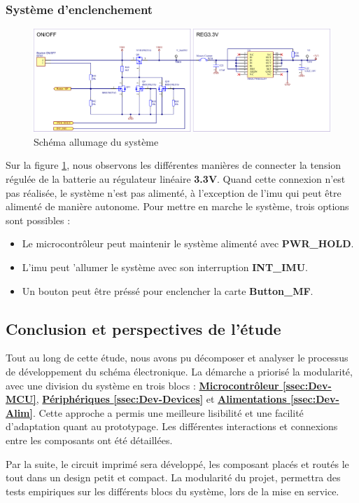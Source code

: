 \clearpage

\subsubsection{Système d'enclenchement} \label{sssec:On-OFF}


\begin{figure}[h]
	\centering
	\includegraphics[width=1\linewidth]{../figures/etude/sch/ON-OFF}
	\caption{Schéma allumage du système}
	\label{fig:on-off}
\end{figure}

Sur la figure \ref{fig:on-off}, nous observons les différentes manières de connecter la tension régulée de la batterie au régulateur linéaire \textbf{3.3V}. Quand cette connexion n'est pas réalisée, le système n'est pas alimenté, à l'exception de l'\gls{imu} qui peut être alimenté de manière autonome. Pour mettre en marche le système, trois options sont possibles : \vspace{2mm}

\begin{itemize}
	\item[\faChevronRight] Le microcontrôleur peut maintenir le système alimenté avec \textbf{PWR\_HOLD}. 
	\item[\faChevronRight] L'\gls{imu} peut 'allumer le système avec son interruption \textbf{INT\_IMU}. 
	\item[\faChevronRight] Un bouton peut être préssé pour enclencher la carte \textbf{Button\_MF}. 
\end{itemize}

\subsection{Conclusion et perspectives de l'étude} \label{ssec:Conclusion-etude}

Tout au long de cette étude, nous avons pu décomposer et analyser le processus de développement du schéma électronique. La démarche a priorisé la modularité, avec une division du système en trois blocs : \hyperref[ssec:Dev-MCU]{\textbf{Microcontrôleur \ref{ssec:Dev-MCU}}}, \hyperref[ssec:Dev-Devices]{\textbf{Périphériques \ref{ssec:Dev-Devices}}} et \hyperref[ssec:Dev-Alim]{\textbf{Alimentations \ref{ssec:Dev-Alim}}}. Cette approche a permis une meilleure lisibilité et une facilité d'adaptation quant au prototypage. Les différentes interactions et connexions entre les composants ont été détaillées.

Par la suite, le circuit imprimé sera développé, les composant placés et routés le tout dans un design petit et compact. La modularité du projet, permettra des tests empiriques sur les différents blocs du système, lors de la mise en service.


